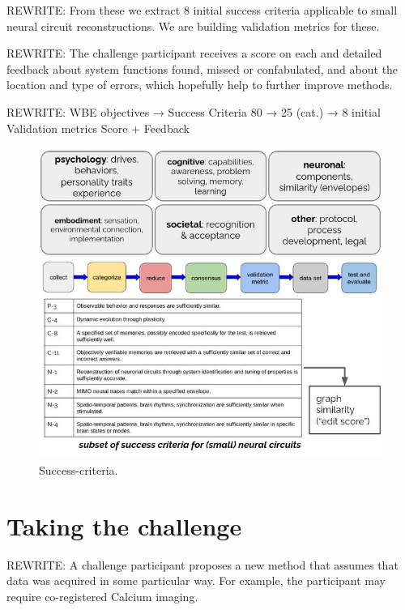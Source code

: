 \documentclass{ldr-article}
\begin{document}
\alert{REWRITE:} From these we extract 8 initial success criteria applicable to small neural circuit reconstructions. We are building validation metrics for these.

\alert{REWRITE:} The challenge participant receives a score on each and detailed feedback about system functions found, missed or confabulated, and about the location and type of errors, which hopefully help to further improve methods.

\alert{REWRITE:} WBE objectives → Success Criteria
80 → 25 (cat.) → 8 initial
Validation metrics
Score + Feedback

\begin{figure}
	\centering
	\includegraphics[width=1\linewidth]{figures/success-criteria.jpg}
	\caption{Success-criteria.}
	\label{fig:success-criteria}
\end{figure}



\section{Taking the challenge}

\alert{REWRITE:} A challenge participant proposes a new method that assumes that data was acquired in some particular way. For example, the participant may require co-registered Calcium imaging.
\end{document}
